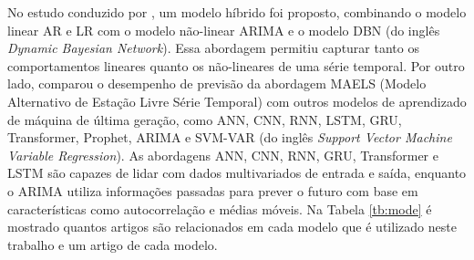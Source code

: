 No estudo conduzido por , um modelo híbrido foi proposto, combinando o modelo linear AR e LR com o modelo não-linear ARIMA e o modelo DBN (do inglês \textit{Dynamic Bayesian Network}). Essa abordagem permitiu capturar tanto os comportamentos lineares quanto os não-lineares de uma série temporal. Por outro lado,  comparou o desempenho de previsão da abordagem MAELS (Modelo Alternativo de Estação Livre Série Temporal) com outros modelos de aprendizado de máquina de última geração, como ANN, CNN, RNN, LSTM, GRU, Transformer, Prophet, ARIMA e SVM-VAR (do inglês \textit{Support Vector Machine Variable Regression}). As abordagens ANN, CNN, RNN, GRU, Transformer e LSTM são capazes de lidar com dados multivariados de entrada e saída, enquanto o ARIMA utiliza informações passadas para prever o futuro com base em características como autocorrelação e médias móveis. Na Tabela \ref{tb:mode} é mostrado quantos artigos são relacionados em cada modelo que é utilizado neste trabalho e um artigo de cada modelo.



